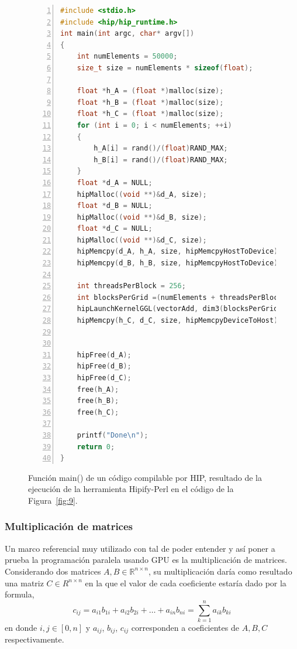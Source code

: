 \newpage

\begin{figure}[h!]
\centering
\begin{lstlisting}[language=C++, frame=single, breaklines=true,basicstyle=\footnotesize, numbers=left, style=CudaStyle]
#include <stdio.h>
#include <hip/hip_runtime.h>
int main(int argc, char* argv[])
{
    int numElements = 50000;
    size_t size = numElements * sizeof(float);
   
    float *h_A = (float *)malloc(size);
    float *h_B = (float *)malloc(size);
    float *h_C = (float *)malloc(size);
    for (int i = 0; i < numElements; ++i)
    {
        h_A[i] = rand()/(float)RAND_MAX;
        h_B[i] = rand()/(float)RAND_MAX;
    }
    float *d_A = NULL;
    hipMalloc((void **)&d_A, size);
    float *d_B = NULL;
    hipMalloc((void **)&d_B, size);
    float *d_C = NULL;
    hipMalloc((void **)&d_C, size);
    hipMemcpy(d_A, h_A, size, hipMemcpyHostToDevice);
    hipMemcpy(d_B, h_B, size, hipMemcpyHostToDevice);

    int threadsPerBlock = 256;
    int blocksPerGrid =(numElements + threadsPerBlock - 1) / threadsPerBlock;
    hipLaunchKernelGGL(vectorAdd, dim3(blocksPerGrid), dim3(threadsPerBlock), 0, 0, d_A, d_B, d_C, numElements);
    hipMemcpy(h_C, d_C, size, hipMemcpyDeviceToHost);

    
    hipFree(d_A);
    hipFree(d_B);
    hipFree(d_C);
    free(h_A);
    free(h_B);
    free(h_C);

    printf("Done\n");
    return 0;
}
\end{lstlisting}
\caption{Función  main()  de un código compilable por HIP, resultado de la ejecución de la herramienta Hipify-Perl en el código de la Figura~\ref{fig:9}.}
\label{fig:10}
\end{figure}
\newpage

\subsubsection{Multiplicación de matrices}

Un marco referencial muy utilizado con tal de poder entender y así poner a prueba la programación paralela usando GPU es la multiplicación de matrices.
Considerando dos matrices $A, B \in \mathbb{R}^{n\times n}$, su multiplicación daría como resultado una matriz $C\in R^{n\times n}$ en la que el valor de cada coeficiente estaría dado por la formula,
\begin{equation*}
    c_{ij} = a_{i1}b_{1i} + a_{i2}b_{2i} + \dots + a_{in}b_{ni} = \sum_{k=1}^n a_{ik}b_{ki}
\end{equation*}
en donde $i, j \in [0,n]$ y \(a_{ij}\), \(b_{ij}\), \(c_{ij}\) corresponden a coeficientes de $A, B, C$ respectivamente.

